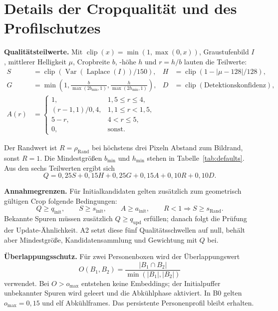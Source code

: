 \documentclass[runningheads,a4paper]{llncs}
\begin{document}
\appendix
\footnotesize
\section{Details der Cropqualität und des Profilschutzes}
\label{app:profile-details}

\noindent\textbf{Qualitätsteilwerte.}
Mit $\operatorname{clip}(x)=\min(1,\max(0,x))$, Graustufenbild $I$, mittlerer Helligkeit $\mu$, Cropbreite $b$, -höhe $h$ und $r=h/b$ lauten die Teilwerte:
\begin{align*}
S&=\operatorname{clip}\!\left(\operatorname{Var}(\operatorname{Laplace}(I))/150\right), &
H&=\operatorname{clip}\!\left(1-|\mu-128|/128\right),\\
G&=\min\!\left(1,\frac{b}{\max(2b_{\min},1)},\frac{h}{\max(2h_{\min},1)}\right), &
D&=\operatorname{clip}(\text{Detektionskonfidenz}),\\
A(r)&=\begin{cases}
1, & 1{,}5\le r\le4,\\
(r-1{,}1)/0{,}4, & 1{,}1\le r<1{,}5,\\
5-r, & 4<r\le5,\\
0, & \text{sonst}.
\end{cases}
\end{align*}

\medskip
Der Randwert ist $R=\rho_{\mathrm{Rand}}$ bei höchstens drei Pixeln Abstand zum Bildrand, sonst $R=1$. Die Mindestgrö{\ss}en $b_{\min}$ und $h_{\min}$ stehen in Tabelle~\ref{tab:defaults}. Aus den sechs Teilwerten ergibt sich
\[
Q=0{,}25S+0{,}15H+0{,}25G+0{,}15A+0{,}10R+0{,}10D.
\]

\medskip
\noindent\textbf{Annahmegrenzen.}
Für Initialkandidaten gelten zusätzlich zum geometrisch gültigen Crop folgende Bedingungen:
\[
Q\ge q_{\mathrm{init}},\qquad
S\ge s_{\mathrm{init}},\qquad
A\ge a_{\mathrm{init}},\qquad
R<1\Longrightarrow S\ge s_{\mathrm{Rand}}.
\]
Bekannte Spuren müssen zusätzlich $Q\ge q_{\mathrm{upd}}$ erfüllen; danach folgt die Prüfung der Update-Ähnlichkeit. A2 setzt diese fünf Qualitätsschwellen auf null, behält aber Mindestgrö{\ss}e, Kandidatensammlung und Gewichtung mit $Q$ bei.

\medskip
\noindent\textbf{Überlappungsschutz.}
Für zwei Personenboxen wird der Überlappungswert
\[
O(B_1,B_2)=\frac{|B_1\cap B_2|}{\min(|B_1|,|B_2|)}
\]
verwendet. Bei $O>o_{\max}$ entstehen keine Embeddings; der Initialpuffer unbekannter Spuren wird geleert und die Abkühlphase aktiviert. In B0 gelten $o_{\max}=0{,}15$ und elf Abkühlframes. Das persistente Personenprofil bleibt erhalten.
\end{document}
